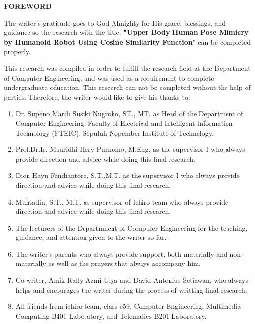 \begin{center}
  \Large
  \textbf{FOREWORD}
\end{center}


\vspace{2ex}


The writer's gratitude goes to God Almighty for His grace, blessings, and guidance
so the research with the title: \textbf{"Upper Body Human Pose Mimicry by Humanoid Robot Using Cosine Similarity Function"} can be completed properly.

This research was compiled in order to fulfill the research field at the Department
of Computer Engineering, and was used as a requirement to complete undergraduate
education. This research can not be completed without the help of parties. Therefore,
the writer would like to give his thanks to:

\begin{enumerate}[nolistsep]

  \item Dr. Supeno Mardi Susiki Nugroho, ST., MT. as Head of the Department of Computer Engineering, Faculty of Electrical and Intelligent Information Technology (FTEIC), Sepuluh Nopember Institute of Technology.
  \item Prof.Dr.Ir. Mauridhi Hery Purnomo, M.Eng. as the supervisor I who always provide direction and advice while doing this final research.
  \item Dion Hayu Fandiantoro, S.T.,M.T. as the supervisor I who always provide direction and advice while doing this final research.
  \item Muhtadin, S.T., M.T. as supervisor of Ichiro team who always provide direction and advice while doing this final research.
  \item The lecturers of the Departmnent of Cornpufer Engineering for the teaching, guidance, and attention given to the writer so far.
  \item The writer's parents who always provide support, both materially and non-materially as well as the prayers that always accompany him.
  \item Co-writer, Amik Rafly Azmi Ulya and David Antonius Setiawan, who always helps and encourages the writer during the process of writting final research.
  \item All friends from ichiro team, class e59, Computer Engineering, Multimedia Computing B401 Laboratory, and Telematics B201 Laboratory.
  
\end{enumerate}

